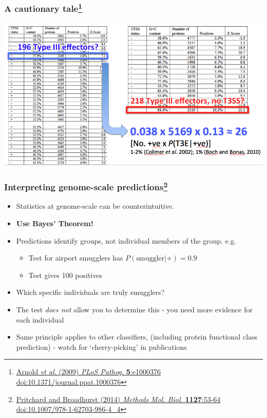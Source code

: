 \begin{frame}
  \frametitle{A cautionary tale\footnote{\tiny{\href{http://dx.doi.org/10.1371/journal.ppat.1000376}{Arnold \textit{et al}. (2009) \textit{PLoS Pathog.} \textbf{5}:e1000376 doi:10.1371/journal.ppat.1000376}}}}
  \begin{center}
    \includegraphics[height=0.65\textheight]{images/arnold_results}  
  \end{center}
\end{frame}

\begin{frame}
  \frametitle{Interpreting genome-scale predictions\footnote{\tiny{\href{http://dx.doi.org/10.1007/978-1-62703-986-4_4}{Pritchard and Broadhurst (2014) \textit{Methods Mol. Biol.} \textbf{1127}:53-64 doi:10.1007/978-1-62703-986-4\_4}}}}
  \begin{itemize}
    \item<1-> Statistics at genome-scale can be counterintuitive.
    \item<1-> \textbf{Use Bayes' Theorem!}
    \item<1-> Predictions identify groups, not individual members of the group. e.g.
    \begin{itemize}
      \item Test for airport smugglers has $P(\text{smuggler}|+) = 0.9$
      \item Test gives 100 positives
    \end{itemize}
    \item<1-> Which specific individuals are truly smugglers?
    \item<2-> The test \emph{does not} allow you to determine this - you need more evidence for each individual
    \item<2->  Same principle applies to other classifiers, (including protein functional class prediction) - watch for `cherry-picking' in publications
  \end{itemize} 
\end{frame}